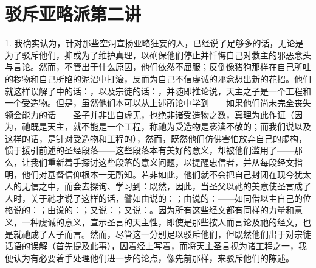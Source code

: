

\section{驳斥亚略派第二讲}

1. 我确实认为，针对那些空洞宣扬亚略狂妄的人，已经说了足够多的话，无论是为了驳斥他们，抑或为了维护真理，以确保他们停止并忏悔自己对救主的邪恶念头与言论。然而，不管出于什么原因，他们依然不屈服；反倒像猪狗那样在自己所吐的秽物和自己所陷的泥沼中打滚，反而为自己不信虔诚的邪念想出新的花招。他们就这样误解了中的话：，以及宗徒的话：，并随即推论说，天主之子是一个工程和一个受造物。但是，虽然他们本可以从上述所论中学到——如果他们尚未完全丧失领会能力的话——圣子并非出自虚无，也绝非诸受造物之数，真理为此作证（因为，祂既是天主，就不能是一个工程，称祂为受造物是亵渎不敬的；而我们说以及这样的话，是针对受造物和工程的），然而，既然他们仿佛害怕放弃自己的虚构，惯于援引前述的圣经段落——这些段落本有美好的意义，却被他们滥用了——那么，让我们重新着手探讨这些段落的意义问题，以提醒忠信者，并从每段经文指明，他们对基督信仰根本一无所知。若非如此，他们就不会把自己封闭在现今犹太人的无信之中，而会去探询、学习到：既然，因此，当圣父以祂的美意使圣言成了人时，关于祂才说了这样的话，譬如由说的：；由说的：——如同借以主自己的位格说的：；由说的：；又说：；又说：。因为所有这些经文都有同样的力量和意义，一种虔诚的意义，宣示圣言的天主性，即使是那些按人而言论及祂的经文，也是就祂成了人子而言。然而，尽管这一分别足以驳斥他们，但既然他们出于对宗徒话语的误解（首先提及此事），因着经上写着，而将天主圣言视为诸工程之一，我便认为有必要着手处理他们进一步的论点，像先前那样，来驳斥他们的陈述。\par

